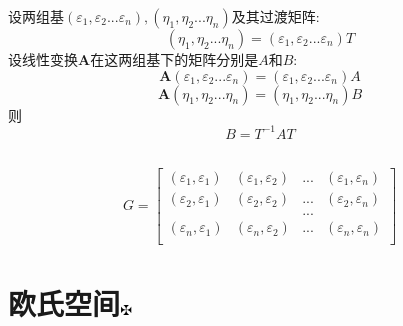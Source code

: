 \documentclass[11pt, a4paper, UTF8]{ctexart}
\begin{document}
\subsubsection{}
设两组基$(\varepsilon_1,\varepsilon_2...\varepsilon_n),(\eta_1,\eta_2...\eta_n)$及其过渡矩阵:
\[(\eta_1,\eta_2...\eta_n)=(\varepsilon_1,\varepsilon_2...\varepsilon_n)T\]
设线性变换$\bm A$在这两组基下的矩阵分别是$A$和$B$:
\[\bm A(\varepsilon_1,\varepsilon_2...\varepsilon_n)=(\varepsilon_1,\varepsilon_2...\varepsilon_n)A\]
\[\bm A(\eta_1,\eta_2...\eta_n)=(\eta_1,\eta_2...\eta_n)B\]
则
\[B=T^{-1}AT\]
\subsection{}
\[G=\begin{bmatrix}
(\varepsilon_1,\varepsilon_1)&(\varepsilon_1,\varepsilon_2)&...&(\varepsilon_1,\varepsilon_n)\\
(\varepsilon_2,\varepsilon_1)&(\varepsilon_2,\varepsilon_2)&...&(\varepsilon_2,\varepsilon_n)\\
&&...&\\
(\varepsilon_n,\varepsilon_1)&(\varepsilon_n,\varepsilon_2)&...&(\varepsilon_n,\varepsilon_n)\\
\end{bmatrix}\]
\section{欧氏空间\protect\hyperlink{catalog}{$\fuck$}}
\end{document}
